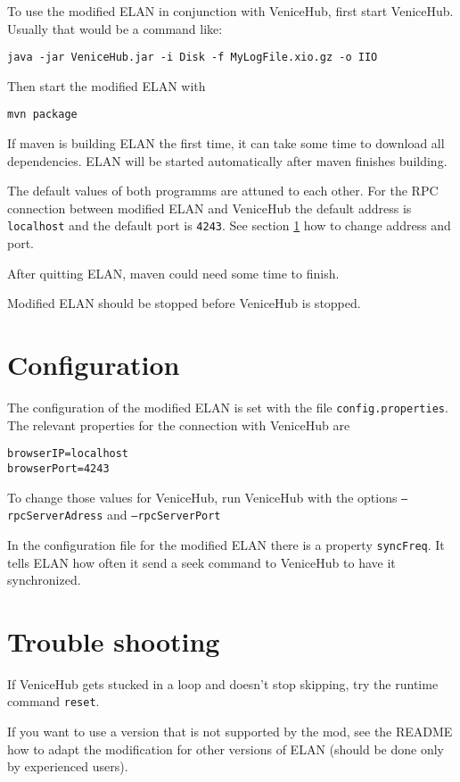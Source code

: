 \documentclass[german,a4paper]{article}
\begin{document}
To use the modified ELAN in conjunction with VeniceHub, first start VeniceHub. Usually that would be a command like:
\begin{lstlisting}
java -jar VeniceHub.jar -i Disk -f MyLogFile.xio.gz -o IIO
\end{lstlisting}

Then start the modified ELAN with
\begin{lstlisting}
mvn package
\end{lstlisting}

If maven is building ELAN the first time, it can take some time to download all dependencies. ELAN will be started automatically after maven finishes building.

The default values of both programms are attuned to each other. For the RPC connection between modified ELAN and VeniceHub the default address is \texttt{localhost} and the default port is \texttt{4243}.
See section \ref{sec:config} how to change address and port.

After quitting ELAN, maven could need some time to finish.

Modified ELAN should be stopped before VeniceHub is stopped.

\section{Configuration}
\label{sec:config}

The configuration of the modified ELAN is set with the file \texttt{config.properties}.
The relevant properties for the connection with VeniceHub are
\begin{lstlisting}
browserIP=localhost
browserPort=4243
\end{lstlisting}

To change those values for VeniceHub, run VeniceHub with the options \texttt{--rpcServerAdress} and \texttt{--rpcServerPort}

In the configuration file for the modified ELAN there is a property \texttt{syncFreq}. It tells ELAN how often it send a seek command to VeniceHub to have it synchronized.

\section{Trouble shooting}

If VeniceHub gets stucked in a loop and doesn't stop skipping, try the runtime command \texttt{reset}.

If you want to use a version that is not supported by the mod, see the README how to adapt the modification for other versions of ELAN (should be done only by experienced users).


\end{document}
